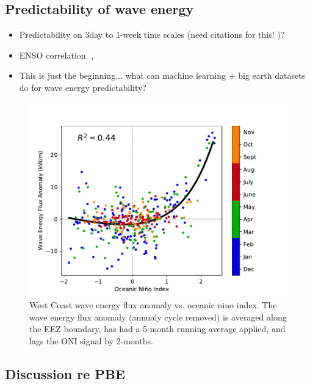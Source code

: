 \subsection{Predictability of wave energy}

\begin{itemize}
\item Predictability on 3day to 1-week time scales (need citations for this! )?
\item ENSO correlation. \citep{yangCharacteristicsVariabilityNearshore2020,andersonClimateIndexOptimized2018}, 
\item This is just the beginning... what can machine learning + big earth datasets do for wave energy predictability?
\end{itemize}


\begin{figure}[ht]
  \centering
  \includegraphics[width=\textwidth]{../fig/ENSO-Comparison.wc.pdf}
  \caption{West Coast wave energy flux anomaly vs. oceanic nino index. The wave energy flux anomaly (annualy cycle removed) is averaged along the EEZ boundary, has had a 5-month running average applied, and lags the ONI signal by 2-months.}
  \label{fig:wc-nino}
\end{figure}


\subsection{Discussion re PBE}

